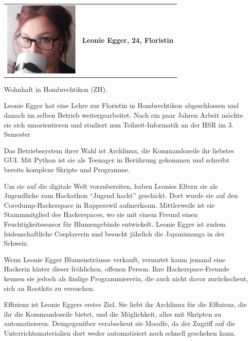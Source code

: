 \documentclass[a4paper]{article}
\begin{document}
\pagebreak
\begin{tabulary}{\linewidth}{m{10em}l}
	\includegraphics[width=10em]{../../img/diverseui01.png} & \textbf{{\large Leonie Egger, 24, Floristin}} \\
\end{tabulary}

\begin{description}[uclist]
	\item[Adresse] Wohnhaft in Hombrechtikon (ZH).
	\item[Ausbildung und Beruf] Leonie Egger hat eine Lehre zur Floristin in Hombrechtikon abgeschlossen und danach im selben Betrieb weitergearbeitet. Nach ein paar Jahren Arbeit möchte sie sich umorientieren und studiert nun Teilzeit-Informatik an der HSR im 3. Semester
	\item[Informatikkenntnisse] Das Betriebssystem ihrer Wahl ist Archlinux, die Kommandozeile ihr liebstes GUI. Mit Python ist sie als Teenager in Berührung gekommen und schreibt bereits komplexe Skripte und Programme.
	\item[Freizeitbeschäftigung] Um sie auf die digitale Welt vorzubereiten, haben Leonies Eltern sie als Jugendliche zum Hackathon ``Jugend hackt'' geschickt. Dort wurde sie auf den Coredump-Hackerspace in Rapperswil aufmerksam. Mittlerweile ist sie Stammmitglied des Hackerspaces, wo sie mit einem Freund einen Feuchtigkeitssensor für Blumengebinde entwickelt. Leonie Egger ist zudem leidenschaftliche Cosplayerin und besucht jährlich die Japanimanga in der Schweiz.
	\item[Persönlichkeit] Wenn Leonie Egger Blumensträusse verkauft, vermutet kaum jemand eine Hackerin hinter dieser fröhlichen, offenen Person. Ihre Hackerspace-Freunde kennen sie jedoch als findige Programmiererin, die auch nicht davor zurückscheut, sich an Rootkits zu versuchen.
	\item[Einschränkungen, Ziele und Wünsche] Effizienz ist Leonie Eggers erstes Ziel. Sie liebt ihr Archlinux für die Effizienz, die ihr die Kommandozeile bietet, und die Möglichkeit, alles mit Skripten zu automatisieren. Demgegenüber verabscheut sie Moodle, da der Zugriff auf die Unterrichtsmaterialien dort weder automatisiert noch schnell geschehen kann.

\end{description}
\end{document}
